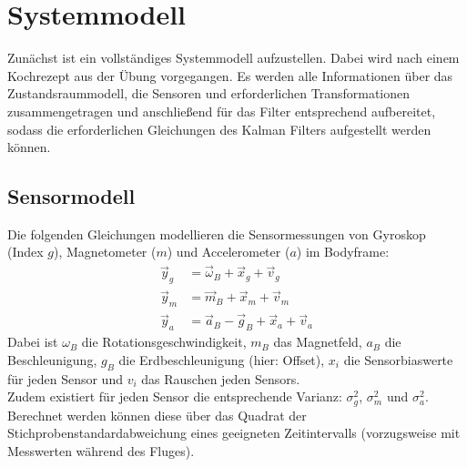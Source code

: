 \documentclass[12pt,a4paper]{article}
\begin{document}
	\section{Systemmodell}\label{sec:Systemmodell}
	Zunächst ist ein vollständiges Systemmodell aufzustellen. Dabei wird nach einem Kochrezept aus der Übung vorgegangen. Es werden alle Informationen über das Zustandsraummodell, die Sensoren und erforderlichen Transformationen zusammengetragen und anschließend für das Filter entsprechend aufbereitet, sodass die erforderlichen Gleichungen des Kalman Filters aufgestellt werden können.
		\subsection{Sensormodell}\label{subsec:Sensormodell}
		Die folgenden Gleichungen modellieren die Sensormessungen von Gyroskop (Index $g$), Magnetometer ($m$) und Accelerometer ($a$) im Bodyframe:
		\begin{align}
			\vec{y}_{g}&=\vec{\omega}_{B}+\vec{x}_{g}+\vec{v}_{g}\label{eq:Sensormodell1}\\
			\vec{y}_{m}&=\vec{m}_{B}+\vec{x}_{m}+\vec{v}_{m}\label{eq:Sensormodell2}\\
			\vec{y}_{a}&=\vec{a}_{B}-\vec{g}_{B}+\vec{x}_{a}+\vec{v}_{a}\label{eq:Sensormodell3}
		\end{align}
		Dabei ist $\omega_{B}$ die Rotationsgeschwindigkeit, $m_{B}$ das Magnetfeld, $a_{B}$ die Beschleunigung, $g_{B}$ die Erdbeschleunigung (hier: Offset), $x_{i}$ die Sensorbiaswerte für jeden Sensor und $v_{i}$ das Rauschen jeden Sensors.\\
		Zudem existiert für jeden Sensor die entsprechende Varianz: $\sigma_{g}^{2}$, $\sigma_{m}^{2}$ und $\sigma_{a}^{2}$. Berechnet werden können diese über das Quadrat der Stichprobenstandardabweichung eines geeigneten Zeitintervalls (vorzugsweise mit Messwerten während des Fluges).
\end{document}
